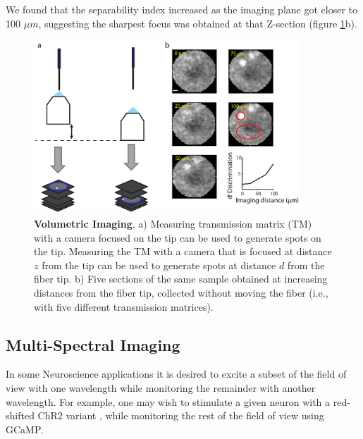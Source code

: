 \documentclass[10pt]{article}
\begin{document}
We found that the separability index increased as the imaging plane got closer to 100 $\mu m$, suggesting the sharpest
focus was obtained at that Z-section (figure \ref{fig:figure5}b). 

\begin{figure}
\centering\includegraphics[width=10cm]{figure5}
\caption{\textbf{Volumetric Imaging}. a) Measuring transmission matrix (TM) with a camera focused on the tip can be used to generate spots on the tip. Measuring the TM with a camera that is focused at distance $z$ from the tip can be used to generate spots at distance $d$ from the fiber tip. b) Five sections of the same sample obtained at increasing distances from the fiber tip, collected without moving the fiber (i.e., with five different transmission matrices).  }
\label{fig:figure5}
\end{figure}

\subsection{Multi-Spectral Imaging}\label{multi_spectral}
In some Neuroscience applications it is desired to excite a subset of the field of view with one wavelength while monitoring the remainder with another wavelength. For example, one may wish to stimulate a given neuron with a red-shifted ChR2 variant \cite{Klapoetke2014-ea}, while monitoring the rest of the field of view using GCaMP. 
\end{document}
